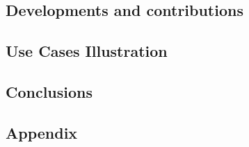 





\cleardoublepage
\begin{addmargin}[-1cm]{-3cm}
\part{Developments and contributions}
\end{addmargin}






\cleardoublepage
\begin{addmargin}[-1cm]{-3cm}
\part{Use Cases Illustration}
\end{addmargin}







\cleardoublepage
\begin{addmargin}[-1cm]{-3cm}
\part{Conclusions}
\end{addmargin}




\appendix
\cleardoublepage
\begin{addmargin}[-1cm]{-3cm}
\part{Appendix}
\end{addmargin}




\cleardoublepage
 

